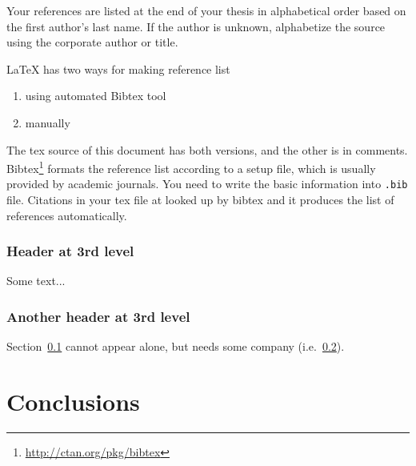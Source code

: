 \documentclass[12pt,a4paper,finnish]{tutthesis}
\begin{document}
Your references are listed at the end of your thesis in alphabetical
order based on the first author's last name. If the author is unknown,
alphabetize the source using the corporate author or title.


LaTeX has two ways for making reference list
\begin{enumerate}
\item using automated Bibtex tool
\item manually
\end{enumerate}

The tex source of this document has both versions, and the other is in
comments. Bibtex\footnote{\url{http://ctan.org/pkg/bibtex}} formats the
reference list according to a setup file, which is usually provided by
academic journals. You need to write the basic information into
\texttt{.bib} file. Citations in your tex file at looked up by bibtex
and it produces the list of references automatically.

\subsection{Header at 3rd level}
\label{sec:3rd}
Some text...

\subsection{Another header at 3rd level}
\label{sec:3rd_partner}

Section~\ref{sec:3rd} cannot appear alone, but needs some company
(i.e.~\ref{sec:3rd_partner}).





\chapter{Conclusions}
\label{ch:concl}
\end{document}
